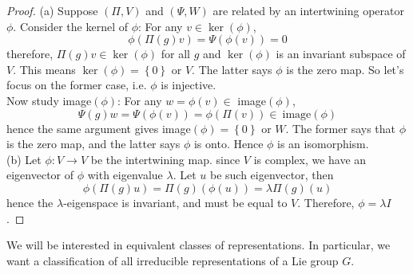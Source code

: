 \documentclass[11pt]{book}
\begin{document}
\begin{proof}
(a) Suppose $(\Pi,V)$ and $(\Psi,W)$ are related by an intertwining operator $\phi$. Consider the kernel of $\phi$: For any $v \in \ker(\phi)$,
$$\phi(\Pi(g)v) = \Psi(\phi(v)) = 0$$
therefore, $\Pi(g)v \in \ker(\phi)$ for all $g$ and  $\ker(\phi)$ is an invariant subspace of $V$. This means $\ker(\phi) = \left\{0\right\}$ or $V$. The latter says $\phi$ is the zero map. So let's focus on the former case, i.e. $\phi$ is injective.\\
Now study image$(\phi)$: For any $w = \phi(v) \in$ image$(\phi)$,
$$\Psi(g)w = \Psi(\phi(v)) = \phi(\Pi(v)) \in\ \text{image}(\phi)$$
hence the same argument gives image$(\phi) = \left\{0\right\}$ or $W$. The former says that $\phi$ is the zero map, and the latter says $\phi$ is onto. Hence $\phi$ is an isomorphism.\\
(b) Let $\phi: V \to V$ be the intertwining map. since $V$ is complex, we have an eigenvector of $\phi$ with eigenvalue $\lambda$. Let $u$ be such eigenvector, then
$$\phi(\Pi(g)u) = \Pi(g)(\phi(u)) = \lambda \Pi(g)(u)$$
hence the $\lambda$-eigenspace is invariant, and must be equal to $V$. Therefore, $\phi = \lambda I$.
\end{proof}



We will be interested in equivalent classes of representations. In particular, we want a classification of all irreducible representations of a Lie group $G$.
\end{document}
